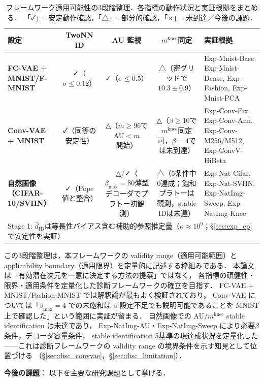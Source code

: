 \documentclass[11pt,a4paper]{jsarticle}
\newcommand{\kap}{\kappa}
\newcommand{\mknee}{m^{\mathrm{knee}}}
\begin{document}
\begin{table}[H]
\centering
\caption{フレームワーク適用可能性の3段階整理．各指標の動作状況と実証根拠をまとめる．
「✓」=安定動作確認，「△」=部分的確認，「×」=未到達／今後の課題．}
\label{tab:applicability_tier}
\small
\begin{tabular}{lcccp{3.8cm}}
\toprule
設定 & TwoNN ID & AU 監視 & $\mknee$同定 & 実証根拠 \\
\midrule
\textbf{FC-VAE + MNIST/F-MNIST}
  & ✓（$\sigma\leq0.12$）
  & ✓（$\sigma\leq0.5$）
  & △（密グリッドで$10.3\pm0.9$）
  & Exp-Mnist-Base, Exp-Mnist-Dense, Exp-Fashion, Exp-Mnist-PCA \\
\addlinespace
\textbf{Conv-VAE + MNIST}
  & ✓（同等の安定性）
  & △（$m\geq96$で AU$<m$開始）
  & △（$\beta\geq10$で$\mknee$同定可，$\beta=4$では未到達）
  & Exp-Conv-Fix, Exp-Conv-Ann, Exp-Conv-M256/M512, Exp-ConvV-HiBeta \\
\addlinespace
\textbf{自然画像（CIFAR-10/SVHN）}
  & ✓（Pope値と整合）
  & △/✓（$\beta_{\max}=80$薄型デコーダでプラトー初観測）
  & △（5条件中0達成；飽和プラトーは観測，stable IDは未達）
  & Exp-Nat-Cifar, Exp-Nat-SVHN, Exp-NatImg-Sweep, Exp-NatImg-Knee \\
\midrule
\multicolumn{5}{l}{\small Stage 1: $\hat{d}_\mathrm{ID}$は等長性バイアス含む補助的参照推定量（$\kap\approx10^9$；§\ref{sec:exp_ep}で安定性を実証）}\\
\bottomrule
\end{tabular}
\end{table}

この3段階整理は，本フレームワークの validity range（適用可能範囲）と
applicability boundary（適用限界）を定量的に記述する枠組みである．
本論文は「有効潜在次元を一意に決定する方法の提案」ではなく，
各指標の頑健性・限界・適用条件を定量化した診断フレームワークの確立を目指す．
FC-VAE + MNIST/Fashion-MNIST では解釈論が最もよく検証されており，
Conv-VAE については「$\beta_{\max}=4$ での未飽和は $\beta$ 設定不足でも説明可能であることを MNIST 上で確認した」という範囲に実証が留まる．
自然画像での AU/$\mknee$ stable identification は未達であり，
Exp-NatImg-AU・Exp-NatImg-Sweep により必要$\beta$条件，デコーダ容量条件，
stable identification 5基準の現達成状況を定量化した——これは診断フレームワークの
validity range の境界条件を示す知見として位置づける
（§\ref{sec:disc_convvae}，§\ref{sec:disc_limitation}）．

\textbf{今後の課題}：
以下を主要な研究課題として挙げる．
\end{document}
